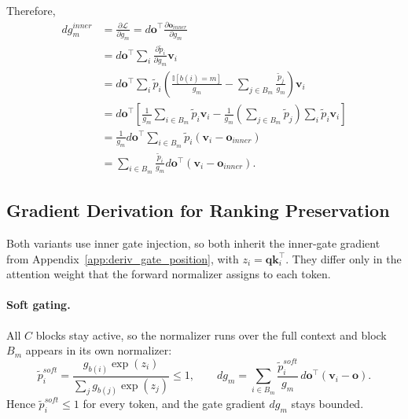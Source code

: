 Therefore,
\[
\begin{aligned}
    dg_m^{inner}
    &=
    \frac{\partial \mathcal{L}}{\partial g_m}
    =
    d\mathbf{o}^{\top}
    \frac{\partial \mathbf{o}_{inner}}{\partial g_m}
    \\
    &=
    d\mathbf{o}^{\top}
    \sum_i
    \frac{\partial \tilde p_i}{\partial g_m}
    \mathbf{v}_i
    \\
    &=
    d\mathbf{o}^{\top}
    \sum_i
    \tilde p_i
    \left(
        \frac{\mathbb{I}[b(i)=m]}{g_m}
        -
        \sum_{j\in B_m}\frac{\tilde p_j}{g_m}
    \right)
    \mathbf{v}_i
    \\
    &=
    d\mathbf{o}^{\top}
    \left[
    \frac{1}{g_m}
    \sum_{i\in B_m}
    \tilde p_i \mathbf{v}_i
    -
    \frac{1}{g_m}
    \left(
        \sum_{j\in B_m}\tilde p_j
    \right)
    \sum_i \tilde p_i\mathbf{v}_i
    \right]
    \\
    &=
    \frac{1}{g_m}
    d\mathbf{o}^{\top}
    \sum_{i\in B_m}
    \tilde p_i
    \left(
        \mathbf{v}_i-\mathbf{o}_{inner}
    \right)
    \\
    &=
    \sum_{i\in B_m}
    \frac{\tilde p_i}{g_m}
    d\mathbf{o}^{\top}
    \left(
        \mathbf{v}_i-\mathbf{o}_{inner}
    \right).
\end{aligned}
\]


\subsection{Gradient Derivation for Ranking Preservation}
\label{app:deriv_ranking_pres}
Both variants use inner gate injection, so both inherit the inner-gate gradient from Appendix~\ref{app:deriv_gate_position}, with $z_i=\mathbf{q}\mathbf{k}_i^\top$.
They differ only in the attention weight that the forward normalizer assigns to each token.

\paragraph{Soft gating.}
All $C$ blocks stay active, so the normalizer runs over the full context and block $B_m$ appears in its own normalizer:
\[
    \tilde p_i^{soft}
    =
    \frac{g_{b(i)}\exp(z_i)}
    {\sum_j g_{b(j)}\exp(z_j)}
    \le 1,
    \qquad
    dg_m
    =
    \sum_{i\in B_m}
    \frac{\tilde p_i^{soft}}{g_m}\,
    d\mathbf{o}^{\top}
    \left(
        \mathbf{v}_i-\mathbf{o}
    \right).
\]
Hence $\tilde p_i^{soft}\le 1$ for every token, and the gate gradient $dg_m$ stays bounded.

